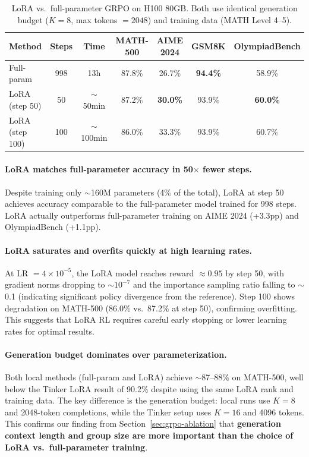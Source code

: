 \documentclass[11pt,a4paper]{article}
\begin{document}
\begin{table}[H]
\centering
\caption{LoRA vs.\ full-parameter GRPO on H100 80GB. Both use identical generation budget ($K=8$, max tokens $= 2048$) and training data (MATH Level 4--5).}
\label{tab:lora-vs-full}
\small
\begin{tabular}{lcccccc}
\toprule
\textbf{Method} & \textbf{Steps} & \textbf{Time} & \textbf{MATH-500} & \textbf{AIME 2024} & \textbf{GSM8K} & \textbf{OlympiadBench} \\
\midrule
Full-param & 998 & 13h & 87.8\% & 26.7\% & \textbf{94.4\%} & 58.9\% \\
LoRA (step 50) & 50 & $\sim$50min & 87.2\% & \textbf{30.0\%} & 93.9\% & \textbf{60.0\%} \\
LoRA (step 100) & 100 & $\sim$100min & 86.0\% & 33.3\% & 93.9\% & 60.7\% \\
\bottomrule
\end{tabular}
\end{table}

\paragraph{LoRA matches full-parameter accuracy in 50$\times$ fewer steps.} Despite training only $\sim$160M parameters (4\% of the total), LoRA at step 50 achieves accuracy comparable to the full-parameter model trained for 998 steps. LoRA actually outperforms full-parameter training on AIME 2024 (+3.3pp) and OlympiadBench (+1.1pp).

\paragraph{LoRA saturates and overfits quickly at high learning rates.} At LR $= 4\times10^{-5}$, the LoRA model reaches reward $\approx 0.95$ by step 50, with gradient norms dropping to $\sim10^{-7}$ and the importance sampling ratio falling to $\sim$0.1 (indicating significant policy divergence from the reference). Step 100 shows degradation on MATH-500 (86.0\% vs.\ 87.2\% at step 50), confirming overfitting. This suggests that LoRA RL requires careful early stopping or lower learning rates for optimal results.

\paragraph{Generation budget dominates over parameterization.} Both local methods (full-param and LoRA) achieve $\sim$87--88\% on MATH-500, well below the Tinker LoRA result of 90.2\% despite using the same LoRA rank and training data. The key difference is the generation budget: local runs use $K=8$ and 2048-token completions, while the Tinker setup uses $K=16$ and 4096 tokens. This confirms our finding from Section~\ref{sec:grpo-ablation} that \textbf{generation context length and group size are more important than the choice of LoRA vs.\ full-parameter training}.
\end{document}
